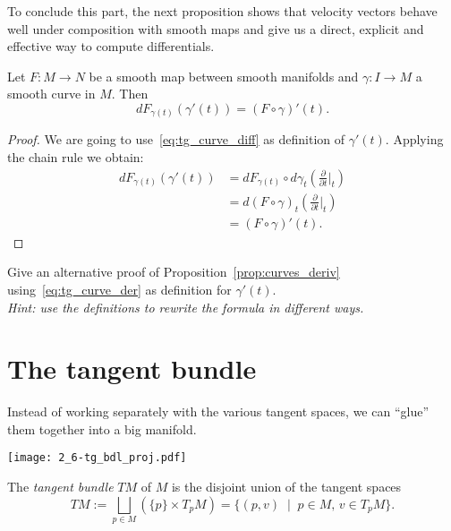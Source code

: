 
To conclude this part, the next proposition shows that velocity vectors behave well under composition with smooth maps and give us a direct, explicit and effective way to compute differentials.

\begin{proposition}\label{prop:curves_deriv}
  Let $F:M\to N$ be a smooth map between smooth manifolds and $\gamma:I\to M$ a smooth curve in $M$.
  Then
  \begin{equation}
    d F_{\gamma(t)} (\gamma'(t)) = (F\circ\gamma)'(t).
  \end{equation}
\end{proposition}
\begin{proof}
  We are going to use~\eqref{eq:tg_curve_diff} as definition of $\gamma'(t)$.
  Applying the chain rule we obtain:
  \begin{align}
    d F_{\gamma(t)} (\gamma'(t))
     & = d F_{\gamma(t)} \circ d\gamma_t\left(\frac{\partial}{\partial t}\Big|_t\right) \\
     & = d (F\circ\gamma)_t \left(\frac{\partial}{\partial t}\Big|_t\right)             \\
     & = (F\circ\gamma)'(t).
  \end{align}
\end{proof}

\begin{exercise}
  Give an alternative proof of Proposition~\ref{prop:curves_deriv} using~\eqref{eq:tg_curve_der} as definition for $\gamma'(t)$.\\
  \textit{\small Hint: use the definitions to rewrite the formula in different ways.}
\end{exercise}

\section{The tangent bundle}\label{sec:tangentbundle}

Instead of working separately with the various tangent spaces, we can ``glue'' them together into a big manifold.

\begin{marginfigure}
  \texttt{[image: 2\_6-tg\_bdl\_proj.pdf]}
\end{marginfigure}
\begin{definition}
  The \emph{tangent bundle} $TM$ of $M$ is the disjoint union of the tangent spaces
  \begin{equation}
    TM := \bigsqcup_{p\in M}\left(\{p\}\times T_pM\right)
    = \{(p,v) \;\mid\; p\in M,\, v\in T_pM\}.
  \end{equation}
\end{definition}

